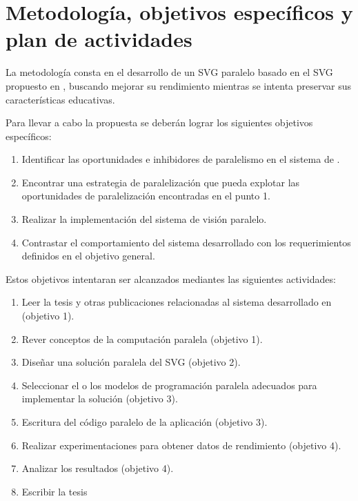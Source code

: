 \documentclass[a4paper]{article}
\begin{document}
\section{Metodología, objetivos específicos y plan de actividades}

La metodología consta en el desarrollo de un SVG paralelo basado en el SVG propuesto en
\cite{torres2014}, buscando mejorar su rendimiento mientras se intenta preservar
sus características educativas.

Para llevar a cabo la propuesta se deberán lograr los siguientes objetivos
específicos:

\begin{enumerate}

	\item{Identificar las oportunidades e inhibidores de paralelismo en el
		sistema de \cite{torres2014}.}

	\item{Encontrar una estrategia de paralelización que pueda explotar las
		oportunidades de paralelización encontradas en el punto 1.} 

	\item{Realizar la implementación del sistema de visión paralelo.}

	\item{Contrastar el comportamiento del sistema desarrollado con los
		requerimientos definidos en el objetivo general.}

\end{enumerate}

Estos objetivos intentaran ser alcanzados mediantes las siguientes actividades:

\begin{enumerate}

	\item{Leer la tesis y otras publicaciones relacionadas al sistema
		desarrollado en \cite{torres2014} (objetivo 1).}
		
	\item{Rever conceptos de la computación paralela (objetivo 1).}

	\item{Diseñar una solución paralela del SVG (objetivo 2).}

	\item{Seleccionar el o los modelos de programación paralela adecuados
		para implementar la solución (objetivo 3).}

	\item{Escritura del código paralelo de la aplicación (objetivo 3).}

	\item{Realizar experimentaciones para obtener datos de rendimiento
		(objetivo 4).}

	\item{Analizar los resultados (objetivo 4).}

	\item{Escribir la tesis}

\end{enumerate}
\end{document}
